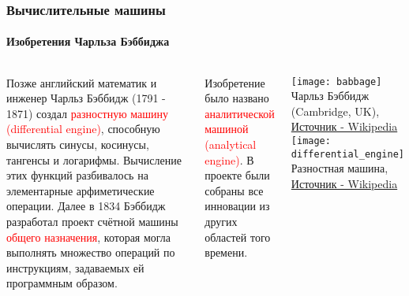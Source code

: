 \documentclass[aspectratio=169]{beamer}
\begin{document}
\begin{frame}
\frametitle{Вычислительные машины}
\framesubtitle{Изобретения Чарльза Бэббиджа}
\begin{block}{}
\begin{columns}[]
\column{\dimexpr\linewidth-30mm}
\justifying
Позже английский математик и инженер Чарльз Бэббидж (1791 - 1871) создал \textcolor{red}{разностную машину (differential engine)}, способную вычислять синусы, косинусы, тангенсы и логарифмы. Вычисление этих функций разбивалось на элементарные арфиметические операции.\newline\newline
Далее в 1834 Бэббидж разработал проект счётной машины \textcolor{red}{общего назначения}, которая могла выполнять множество операций по инструкциям, задаваемых ей программным образом. \newline

Изобретение было названо \textcolor{red}{аналитической машиной (analytical engine)}. В проекте были собраны все инновации из других областей того времени.

\column{30mm}

\texttt{[image: babbage]}
\tiny Чарльз Бэббидж (Cambridge, UK), \href{https://en.wikipedia.org/wiki/Charles_Babbage}{Источник - Wikipedia} 
\newline\newline
\texttt{[image: differential\_engine]}\newline
\tiny Разностная машина, \href{https://en.wikipedia.org/wiki/Charles_Babbage}{Источник - Wikipedia} 

\end{columns}
\end{block}
\end{frame}
\end{document}
